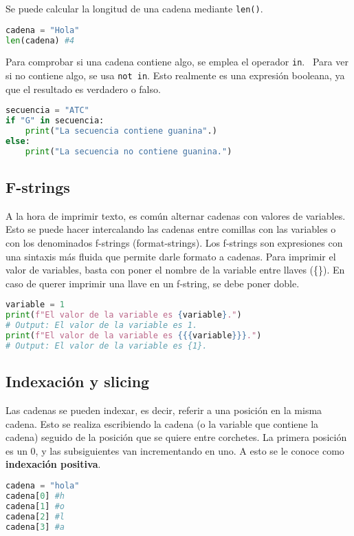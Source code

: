 Se puede calcular la longitud de una cadena mediante \texttt{len()}.   \
\begin{lstlisting}[language=Python]
cadena = "Hola"
len(cadena) #4
\end{lstlisting}

Para comprobar si una cadena contiene algo, se emplea el operador \texttt{in}.   \ Para ver si no contiene algo, se usa \texttt{not in}. Esto realmente es una expresión booleana, ya que el resultado es verdadero o falso. 
\begin{lstlisting}[language=Python]
secuencia = "ATC"
if "G" in secuencia:
	print("La secuencia contiene guanina".)
else:
	print("La secuencia no contiene guanina.")
\end{lstlisting}

\subsection{F-strings}
A la hora de imprimir texto, es común alternar cadenas con valores de variables. Esto se puede hacer intercalando las cadenas entre comillas con las variables o con los denominados f-strings (format-strings). Los f-strings son expresiones con una sintaxis más fluida que permite darle formato a cadenas. Para imprimir el valor de variables, basta con poner el nombre de la variable entre llaves (\{\}). En caso de querer imprimir una llave en un f-string, se debe poner doble.
\begin{lstlisting}[language=Python]
variable = 1
print(f"El valor de la variable es {variable}.")
# Output: El valor de la variable es 1.
print(f"El valor de la variable es {{{variable}}}.")
# Output: El valor de la variable es {1}.
\end{lstlisting}

\subsection{Indexación y slicing}
Las cadenas se pueden indexar, es decir, referir a una posición en la misma cadena. Esto se realiza escribiendo la cadena (o la variable que contiene la cadena) seguido de la posición que se quiere entre corchetes. La primera posición es un 0, y las subsiguientes van incrementando en uno. A esto se le conoce como \textbf{indexación positiva}. 
\begin{lstlisting}[language=Python]
cadena = "hola"
cadena[0] #h
cadena[1] #o
cadena[2] #l
cadena[3] #a
\end{lstlisting}

